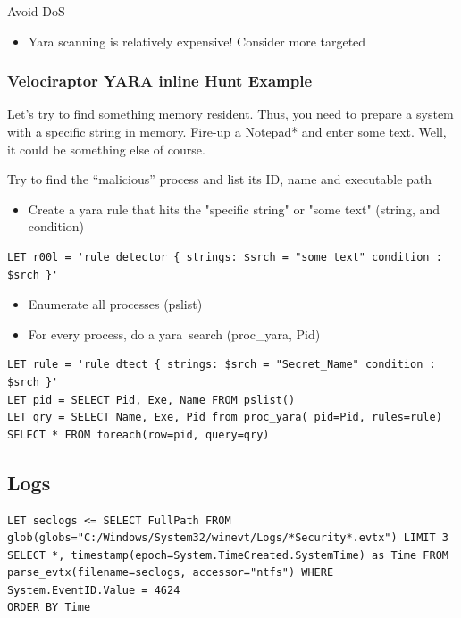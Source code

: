 Avoid DoS
\begin{itemize}
  \item Yara scanning is relatively expensive! Consider more targeted
\end{itemize}

\subsubsection*{Velociraptor YARA inline Hunt Example}

Let’s try to find something memory resident. Thus, you need to prepare a system with a specific string in memory.
Fire-up a Notepad* and enter some text. Well, it could be something else of course.

Try to find the “malicious” process and list its ID, name and executable path
\begin{itemize}
  \item Create a yara rule that hits the "specific string" or "some text" (string, and condition)
\end{itemize}

\begin{lstlisting}[basicstyle=\ttfamily]
LET r00l = 'rule detector { strings: $srch = "some text" condition : $srch }'
\end{lstlisting}

\begin{itemize}
  \item Enumerate all processes (pslist)
  \item For every process, do a yara\ search (proc\_yara, Pid)
\end{itemize}

\begin{lstlisting}[basicstyle=\ttfamily]
LET rule = 'rule dtect { strings: $srch = "Secret_Name" condition : $srch }'
LET pid = SELECT Pid, Exe, Name FROM pslist()
LET qry = SELECT Name, Exe, Pid from proc_yara( pid=Pid, rules=rule)
SELECT * FROM foreach(row=pid, query=qry)
\end{lstlisting}

\subsection{Logs}
\begin{lstlisting}[basicstyle=\ttfamily]
LET seclogs <= SELECT FullPath FROM
glob(globs="C:/Windows/System32/winevt/Logs/*Security*.evtx") LIMIT 3
SELECT *, timestamp(epoch=System.TimeCreated.SystemTime) as Time FROM
parse_evtx(filename=seclogs, accessor="ntfs") WHERE System.EventID.Value = 4624
ORDER BY Time
\end{lstlisting}

